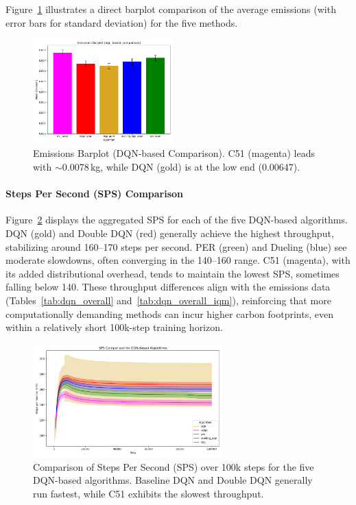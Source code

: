 Figure~\ref{fig:dqn_comp_emissions_bar} illustrates a direct barplot comparison
of the average emissions (with error bars for standard deviation) for the five methods.
\begin{figure}
	\centering
	\includegraphics[width=0.48\textwidth]{figures/dqn_based_comparison/barplot_emissions_dqn_based_comparison.png}
	\caption{Emissions Barplot (DQN-based Comparison). 
		C51 (magenta) leads with $\sim$\num{0.0078}\,kg, while DQN (gold) is at the low end (\num{0.00647}).}
	\label{fig:dqn_comp_emissions_bar}
\end{figure}

\paragraph{Steps Per Second (SPS) Comparison}
Figure~\ref{fig:dqn_comp_sps} displays the aggregated SPS for each of the five DQN-based algorithms.
DQN (gold) and Double DQN (red) generally achieve the highest throughput, stabilizing around
160--170 steps per second. PER (green) and Dueling (blue) see moderate slowdowns, often converging
in the 140--160 range. C51 (magenta), with its added distributional overhead, tends to maintain
the lowest SPS, sometimes falling below 140. These throughput differences align with the 
emissions data (Tables~\ref{tab:dqn_overall} and~\vref{tab:dqn_overall_iqm}), reinforcing that more
computationally demanding methods can incur higher carbon footprints, even within a 
relatively short 100k-step training horizon.

\begin{figure}
	\centering
	\includegraphics[width=0.65\textwidth]{figures/dqn_based_comparison/sps_dqn_based.png}
	\caption{Comparison of Steps Per Second (SPS) over 100k steps for the five DQN-based algorithms. 
		Baseline DQN and Double DQN generally run fastest, while C51 exhibits the slowest throughput.}
	\label{fig:dqn_comp_sps}
\end{figure}

